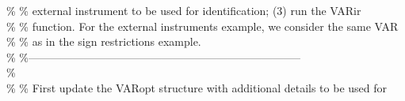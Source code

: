 \hspace{1mm}\hspace{5mm} \hspace{5mm} \hspace{5mm} \hspace{5mm} \hspace{5mm} \textcolor{matlabgreen}{\% }\textcolor{matlabgreen}{\% external instrument to be used \textcolor{matlabblue}{for} identification; (3) run the VARir  }\\ 
\hspace{1mm}\hspace{5mm} \hspace{5mm} \hspace{5mm} \hspace{5mm} \hspace{5mm} \hspace{5mm} \textcolor{matlabgreen}{\% }\textcolor{matlabgreen}{\% function. For the external instruments example, we consider the same VAR  }\\ 
\hspace{1mm}\hspace{5mm} \hspace{5mm} \hspace{5mm} \hspace{5mm} \hspace{5mm} \hspace{5mm} \textcolor{matlabgreen}{\% }\textcolor{matlabgreen}{\% as in the sign restrictions example.  }\\ 
\hspace{1mm}\hspace{5mm} \hspace{5mm} \hspace{5mm} \hspace{5mm} \hspace{5mm} \hspace{5mm} \textcolor{matlabgreen}{\% }\textcolor{matlabgreen}{\%--------------------------------------------------------------------------  }\\ 
\hspace{1mm}\hspace{5mm} \hspace{5mm} \hspace{5mm} \hspace{5mm} \hspace{5mm} \hspace{5mm} \textcolor{matlabgreen}{\%  }\\ 
\hspace{1mm}\hspace{5mm} \hspace{5mm} \hspace{5mm} \hspace{5mm} \hspace{5mm} \hspace{5mm} \textcolor{matlabgreen}{\% }\textcolor{matlabgreen}{\% First update the VARopt structure with additional details to be used \textcolor{matlabblue}{for} }\\ 
